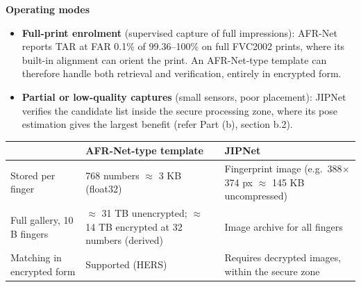 \documentclass[10pt,a4paper]{article}
\begin{document}
\textbf{Operating modes}
\begin{itemize}
\item \textbf{Full-print enrolment} (supervised capture of full impressions): AFR-Net reports TAR at FAR 0.1\% of 99.36--100\% on full FVC2002 prints, where its built-in alignment can orient the print. An AFR-Net-type template can therefore handle both retrieval and verification, entirely in encrypted form.
\item \textbf{Partial or low-quality captures} (small sensors, poor placement): JIPNet verifies the candidate list inside the secure processing zone, where its pose estimation gives the largest benefit (refer Part (b), section b.2).
\end{itemize}
\begin{tabularx}{\textwidth}{@{}>{\raggedright}p{3.6cm}>{\raggedright}X>{\raggedright\arraybackslash}X@{}}\toprule
 & \textbf{AFR-Net-type template} & \textbf{JIPNet}\\\midrule
Stored per finger & 768 numbers $\approx$ 3 KB (float32) & Fingerprint image (e.g.\ 388$\times$374 px $\approx$ 145 KB uncompressed)\\
Full gallery, 10 B fingers & $\approx$ 31 TB unencrypted; $\approx$ 14 TB encrypted at 32 numbers (derived) & Image archive for all fingers\\
Matching in encrypted form & Supported (HERS) & Requires decrypted images, within the secure zone\\\bottomrule
\end{tabularx}
\end{document}
